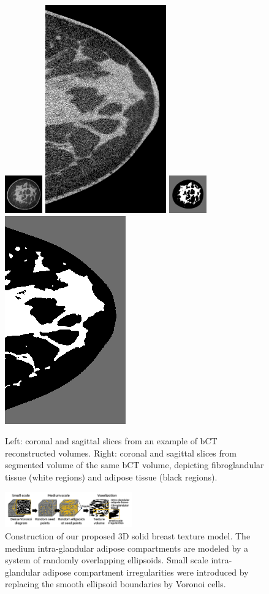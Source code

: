 \documentclass[journal]{IEEEtran}
\begin{document}
\begin{figure}[!htbp]
  \centering \includegraphics[width=0.145\textwidth]{gray-cor-small}%
  \includegraphics[height=0.145\textwidth]{gray-sag-small}%
  \hspace{2mm}%
  \includegraphics[width=0.145\textwidth]{seg-cor-small}%
  \includegraphics[height=0.145\textwidth]{seg-sag-small}

  \caption{Left: coronal and sagittal slices from an example of bCT
    reconstructed volumes. Right: coronal and sagittal slices from
    segmented volume of the same bCT volume, depicting fibroglandular
    tissue (white regions) and adipose tissue (black regions).}
  \label{fig:bct-ims}
\end{figure}

\begin{figure}[!htbp]
  \centering \includegraphics[width=0.49\textwidth]{model-pipeline}
  \caption{Construction of our proposed 3D solid breast texture
    model. The medium intra-glandular adipose compartments are modeled
    by a system of randomly overlapping ellipsoids. Small scale
    intra-glandular adipose compartment irregularities were introduced
    by replacing the smooth ellipsoid boundaries by Voronoi cells.}
  \label{fig:model}
\end{figure}
\end{document}
